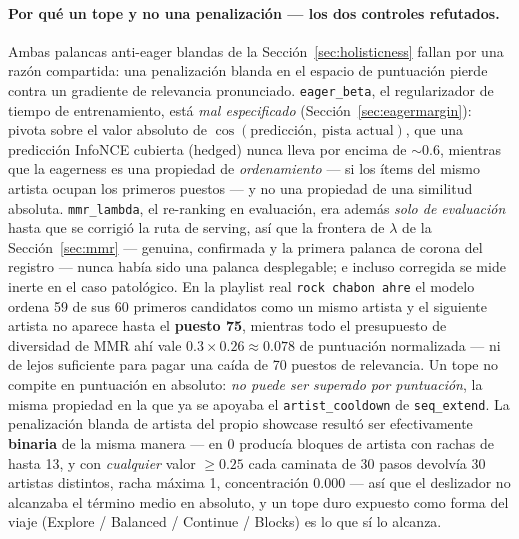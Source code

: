 \documentclass[11pt]{article}
\begin{document}
\paragraph{Por qué un tope y no una penalización --- los dos controles
refutados.} Ambas palancas anti-eager blandas de la
Sección~\ref{sec:holisticness} fallan por una razón compartida: una penalización
blanda en el espacio de puntuación pierde contra un gradiente de relevancia
pronunciado. \texttt{eager\_beta}, el regularizador de tiempo de entrenamiento,
está \emph{mal especificado} (Sección~\ref{sec:eagermargin}): pivota sobre el
valor absoluto de
$\cos(\text{predicción},\ \text{pista actual})$, que una predicción InfoNCE
cubierta (hedged) nunca lleva por encima de ${\sim}0.6$, mientras que la
eagerness es una propiedad de \emph{ordenamiento} --- si los ítems del mismo
artista ocupan los primeros puestos --- y no una propiedad de una similitud
absoluta. \texttt{mmr\_lambda}, el re-ranking en evaluación, era además
\emph{solo de evaluación} hasta que se corrigió la ruta de serving, así que la
frontera de $\lambda$ de la Sección~\ref{sec:mmr} --- genuina, confirmada y la
primera palanca de corona del registro --- nunca había sido una palanca
desplegable; e incluso
corregida se mide inerte en el caso patológico. En la playlist real
\texttt{rock chabon ahre} el modelo ordena \num{59} de sus \num{60} primeros
candidatos como un mismo artista y el siguiente artista no aparece hasta el
\textbf{puesto \num{75}}, mientras todo el presupuesto de diversidad de MMR ahí
vale $\num{0.3}\times\num{0.26}\approx\num{0.078}$ de puntuación normalizada ---
ni de lejos suficiente para pagar una caída de 70 puestos de relevancia. Un tope
no compite en puntuación en absoluto: \emph{no puede ser superado por
puntuación}, la misma propiedad en la que ya se apoyaba el
\texttt{artist\_cooldown} de \texttt{seq\_extend}. La penalización blanda de
artista del propio showcase resultó ser efectivamente \textbf{binaria} de la
misma manera --- en \num{0} producía bloques de artista con rachas de hasta
\num{13}, y con \emph{cualquier} valor $\ge\num{0.25}$ cada caminata de 30 pasos
devolvía \num{30} artistas distintos, racha máxima \num{1}, concentración
\num{0.000} --- así que el deslizador no alcanzaba el término medio en absoluto,
y un tope duro expuesto como forma del viaje (Explore / Balanced / Continue /
Blocks) es lo que sí lo alcanza.
\end{document}
